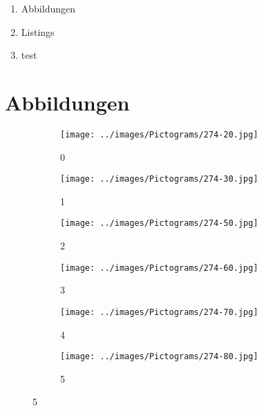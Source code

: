 
\addchap{\langanhang}

 

{\Large
\begin{enumerate}[label=\Alph*.]
	\item Abbildungen
	\item Listings
	\item test
\end{enumerate}
}
\pagebreak

\chapter*{Abbildungen}

\begin{figure}[H]
   \centering
	\captionsetup[subfigure]{labelformat=empty}
   \begin{subfigure}[b]{0.1\textwidth}
       \centering
       \texttt{[image: ../images/Pictograms/274-20.jpg]}
       \caption{0}
   \end{subfigure}
   \hspace{3em}%
   \begin{subfigure}[b]{0.1\textwidth}
       \centering
       \texttt{[image: ../images/Pictograms/274-30.jpg]}
       \caption{1}
   \end{subfigure}
   \hspace{3em}%
   \begin{subfigure}[b]{0.1\textwidth}
       \centering
       \texttt{[image: ../images/Pictograms/274-50.jpg]}
       \caption{2}
   \end{subfigure}
   \hspace{3em}%
   \begin{subfigure}[b]{0.1\textwidth}
    \centering
    \texttt{[image: ../images/Pictograms/274-60.jpg]}
    \caption{3}
	\end{subfigure}
	\hspace{3em}%
	\begin{subfigure}[b]{0.1\textwidth}
		\centering
		\texttt{[image: ../images/Pictograms/274-70.jpg]}
		\caption{4}
	\end{subfigure}
	\hspace{3em}%
	\begin{subfigure}[b]{0.1\textwidth}
		\centering
		\texttt{[image: ../images/Pictograms/274-80.jpg]}
		\caption{5}
	\end{subfigure}

\end{figure}
